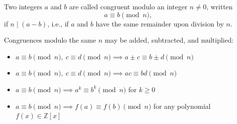 Two integers $a$ and $b$ are called congruent modulo an integer $n \neq 0$, written
$$a \equiv b \pmod{n},$$
if $n \mid (a - b)$, i.e., if $a$ and $b$ have the same remainder upon division by $n$.

Congruences modulo the same $n$ may be added, subtracted, and multiplied:
\begin{itemize}
\item $a \equiv b \pmod{n},\ c \equiv d \pmod{n} \implies a \pm c \equiv b \pm d \pmod{n}$
\item $a \equiv b \pmod{n},\ c \equiv d \pmod{n} \implies ac \equiv bd \pmod{n}$
\item $a \equiv b \pmod{n} \implies a^k \equiv b^k \pmod{n}$ for $k \geq 0$
\item $a \equiv b \pmod{n} \implies f(a) \equiv f(b) \pmod{n}$ for any polynomial $f(x) \in \mathbb{Z}[x]$
\end{itemize}
